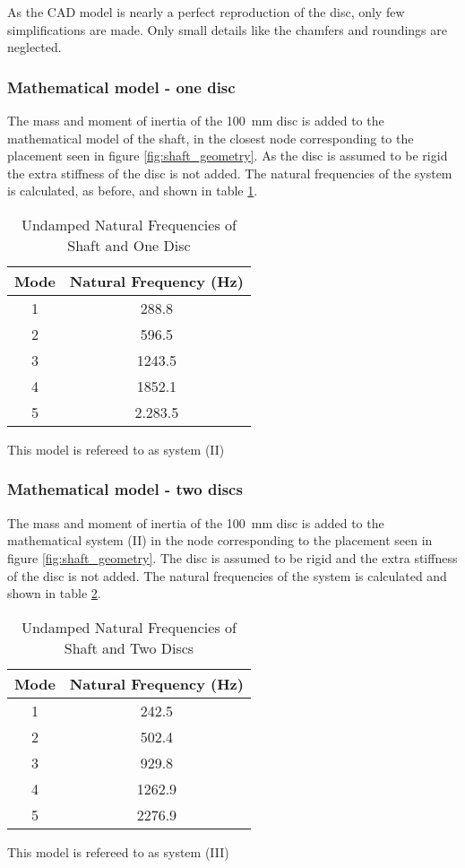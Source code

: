 As the CAD model is nearly a perfect reproduction of the disc, only few simplifications are made. Only small details like the chamfers and roundings are neglected.

\subsubsection{Mathematical model - one disc}
The mass and moment of inertia of the \SI{100}{\milli \meter} disc is added to the mathematical model of the shaft, in the closest node corresponding to the placement seen in figure \ref{fig:shaft_geometry}.
As the disc is assumed to be rigid the extra stiffness of the disc is not added. The natural frequencies of the system is calculated, as before, and shown in table \ref{tab:natural_freq_one_disc}.
\begin{table}[ht]
    \centering
    \caption{Undamped Natural Frequencies of Shaft and One Disc}
    \label{tab:natural_freq_one_disc}
    \begin{tabular}{@{}cc@{}}
        \toprule
        Mode    &   Natural Frequency (\si{\hertz})    \\ \midrule
        1       &   288.8   \\
        2       &   596.5   \\
        3       &   1243.5  \\
        4       &   1852.1  \\ 
        5       &   2.283.5 \\ \bottomrule
    \end{tabular}
\end{table}
This model is refereed to as system (II)

\subsubsection{Mathematical model - two discs}
The mass and moment of inertia of the \SI{100}{\milli \meter} disc is added to the mathematical system (II) in the node corresponding to the placement seen in figure \ref{fig:shaft_geometry}.
The disc is assumed to be rigid and the extra stiffness of the disc is not added. The natural frequencies of the system is calculated and shown in table \ref{tab:natural_freq_two_discs}.
\begin{table}[ht]
    \centering
    \caption{Undamped Natural Frequencies of Shaft and Two Discs}
    \label{tab:natural_freq_two_discs}
    \begin{tabular}{@{}cc@{}}
        \toprule
        Mode    &   Natural Frequency (\si{\hertz})    \\ \midrule
        1       &   242.5   \\
        2       &   502.4   \\
        3       &   929.8  \\
        4       &   1262.9  \\ 
        5       &   2276.9 \\ \bottomrule
    \end{tabular}
\end{table}
This model is refereed to as system (III)

